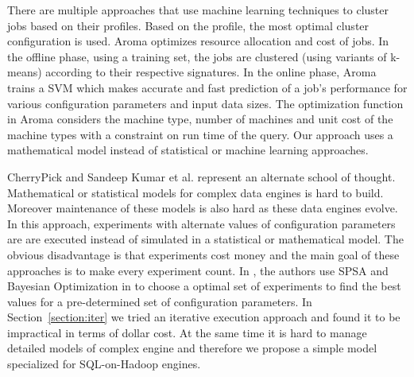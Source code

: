 There are multiple approaches \cite{wu2013self} \cite{lama2012aroma} that use machine learning techniques
to cluster jobs based on their profiles. Based on the profile, the most optimal cluster configuration is
used. Aroma \cite{lama2012aroma} optimizes resource allocation and cost of jobs. In
the offline phase, using a training set, the jobs are clustered
(using variants of k-means) according to their respective signatures.
In the online phase, Aroma trains a SVM which makes
accurate and fast prediction of a job's performance for various
configuration parameters and input data sizes. The optimization function in Aroma considers
the machine type, number of machines and unit cost of the machine types with a constraint on
run time of the query. Our approach uses a mathematical model instead of statistical or machine learning approaches. 
 
CherryPick\cite{Li:2014:MMO:2600212.2600229} and Sandeep Kumar et al.\cite{KumarPLPGB16} represent an alternate school of thought.
Mathematical or statistical models for complex data engines is hard to build. Moreover maintenance of these models 
is also hard as these data engines evolve. In this approach, experiments
with alternate values of configuration parameters are are executed instead of simulated in a 
statistical or mathematical model. The obvious disadvantage is that experiments cost money and the main 
goal of these approaches is to make every experiment count. In \cite{KumarPLPGB16}, the authors use SPSA and Bayesian Optimization in \cite{Li:2014:MMO:2600212.2600229} 
to choose a optimal set of experiments to find the best values for a pre-determined set of configuration parameters.
In Section~\ref{section:iter} we tried an iterative execution approach and found it to be impractical in terms of dollar cost. 
At the same time it is hard to manage detailed models of complex engine and therefore
we propose a simple model specialized for SQL-on-Hadoop engines.
  
